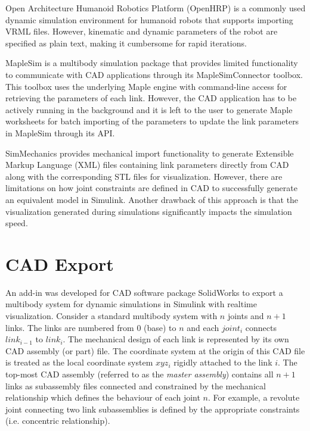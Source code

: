 Open Architecture Humanoid Robotics Platform (OpenHRP) \cite{Kanehiro:2004dq} is a commonly used dynamic simulation environment for humanoid robots that supports importing VRML files. However, kinematic and dynamic parameters of the robot are specified as plain text, making it cumbersome for rapid iterations.

MapleSim \cite{sw:maplesim} is a multibody simulation package that provides limited functionality to communicate with CAD applications through its MapleSimConnector toolbox. This toolbox uses the underlying Maple engine with command-line access for retrieving the parameters of each link. However, the CAD application has to be actively running in the background and it is left to the user to generate Maple worksheets for batch importing of the parameters to update the link parameters in MapleSim through its API.

SimMechanics \cite{sw:simmech} provides mechanical import functionality to generate Extensible Markup Language (XML) files containing link parameters directly from CAD along with the corresponding STL files for visualization. However, there are limitations on how joint constraints are defined in CAD to successfully generate an equivalent model in Simulink. Another drawback of this approach is that the visualization generated during simulations significantly impacts the simulation speed.

\section{CAD Export} %
\label{sec:cad_export}

An add-in was developed for CAD software package SolidWorks to export a multibody system for dynamic simulations in Simulink with realtime visualization. Consider a standard multibody system with $n$ joints and $n + 1$ links. The links are numbered from 0 (base) to $n$ and each $joint_{i}$ connects $link_{i-1}$ to $link_{i}$. The mechanical design of each link is represented by its own CAD assembly (or part) file. The coordinate system at the origin of this CAD file is treated as the local coordinate system $xyz_{i}$ rigidly attached to the link $i$. The top-most CAD assembly (referred to as the \emph{master assembly}) contains all $n + 1$ links as subassembly files connected and constrained by the mechanical relationship which defines the behaviour of each joint $n$. For example, a revolute joint connecting two link subassemblies is defined by the appropriate constraints (i.e. concentric relationship).

